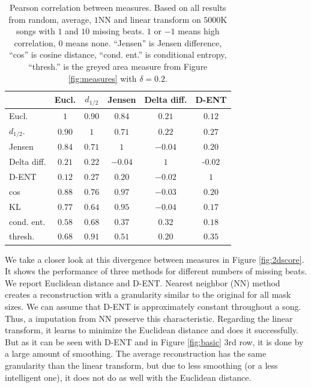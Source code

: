 \documentclass{article}
\begin{document}
\begin{table}[t]
\begin{small}
\begin{center}
\begin{tabular}{|l|c|c|c|c|c|} \hline
 & Eucl. & $d_{1/2}$ & Jensen & Delta diff. & D-ENT \\ \hline
Eucl. & $1$ & $0.90$ & $0.84$ & $0.21$ & $0.12$ \\ 
$d_{1/2}$. & $0.90$ & $1$ & $0.71$ & $0.22$ & $0.27$ \\ 
Jensen & $0.84$ & $0.71$ & $1$ & $-0.04$ & $0.20$ \\ \hline 
Delta diff. & $\mathbf{0.21}$ & $0.22$ & $-0.04$ & $1$ & -$0.02$ \\ 
D-ENT & $\mathbf{0.12}$ & $0.27$ & $0.20$ & $-0.02$ & $1$ \\ \hline
cos & $0.88$ & $0.76$ & $0.97$ & $-0.03$ & $0.20$ \\
KL & $0.77$ & $0.64$ & $0.95$ & $-0.04$ & $0.17$ \\ 
cond. ent. & $0.58$ & $0.68$ & $0.37$ & $0.32$ & $0.18$ \\
thresh. & $0.68$ & $0.91$ & $0.51$ & $0.20$ & $0.35$ \\ \hline
\end{tabular}
\caption{Pearson correlation between measures. Based on all results
  from random, average, $1$NN and linear transform on $5000$K songs
  with $1$ and $10$ missing beats. $1$ or $-1$ means high correlation,
  $0$ means none. ``Jensen'' is Jensen difference, ``cos'' is cosine
  distance, ``cond. ent.'' is conditional entropy, ``thresh.'' is the
  greyed area measure from Figure \ref{fig:measures} with $\delta =
  0.2$.
\label{tab:corrs}}
\end{center}
\end{small}
\end{table}

We take a closer look at this divergence between measures in Figure
\ref{fig:2dscore}.  It shows the performance of three methods for
different numbers of missing beats. We report Euclidean distance and
D-ENT. Nearest neighbor (NN) method creates a reconstruction with a
granularity similar to the original for all mask sizes. We can assume
that D-ENT is approximately constant throughout a song. Thus, a
imputation from NN preserve this characteristic.  Regarding the linear
transform, it learns to minimize the Euclidean distance and does it
successfully. But as it can be seen with D-ENT and in Figure
\ref{fig:basic} $3$rd row, it is done by a large amount of
smoothing. The average reconstruction has the same granularity than
the linear transform, but due to less smoothing (or a less intelligent
one), it does not do as well with the Euclidean distance.
\end{document}
